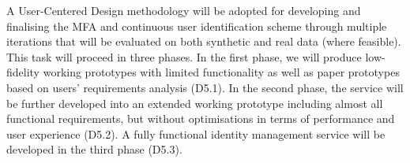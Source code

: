 \begin{Workpackage}{\thewpno}
\begin{Task}
A User-Centered Design methodology will be adopted for developing and finalising the MFA and continuous user identification scheme through multiple iterations that will be evaluated on both synthetic and real data (where feasible). 
This task will proceed in three phases. In the first phase, we will produce low-fidelity working prototypes with limited functionality as well as paper prototypes based on users’ requirements analysis (D5.1). In the second phase, the service will be further developed into an extended working prototype including almost all functional requirements, but without optimisations in terms of performance and user experience (D5.2). A fully functional identity management service will be developed in the third phase (D5.3). 

\end{Task}
\end{Workpackage}
